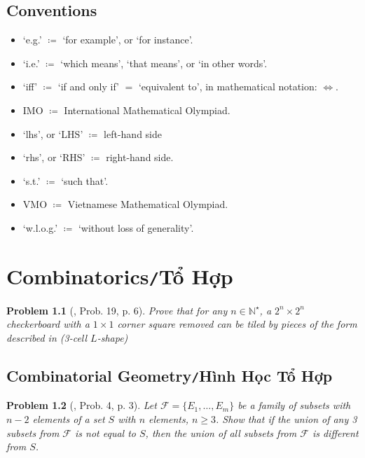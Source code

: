 \documentclass[oneside]{book}
\numberwithin{equation}{section}
\newtheorem{problem}{Problem}[section]
\begin{document}
\section*{Conventions}
\begin{itemize}
	\item `e.g.' $\coloneqq$ `for example', or `for instance'.
	\item `i.e.' $\coloneqq$ `which means', `that means', or `in other words'.
	\item `iff' $\coloneqq$ `if and only if' $=$ `equivalent to', in mathematical notation: $\Leftrightarrow$.
	\item IMO $\coloneqq$ International Mathematical Olympiad.
	\item `lhs', or `LHS' $\coloneqq$ left-hand side
	\item `rhs', or `RHS' $\coloneqq$ right-hand side.
	\item `s.t.' $\coloneqq$ `such that'.
	\item VMO $\coloneqq$ Vietnamese Mathematical Olympiad.
	\item `w.l.o.g.' $\coloneqq$ `without loss of generality'.
\end{itemize}


\chapter{Combinatorics\texttt{/}Tổ Hợp}

\begin{problem}[\cite{Gelca_Andreescu2017}, Prob. 19, p. 6]
	Prove that for any $n\in\mathbb{N}^\star$, a $2^n\times 2^n$ checkerboard with a $1\times 1$ corner square removed can be tiled by pieces of the form described in \cite[Fig. 2, p. 6]{Gelca_Andreescu2017} (3-cell $L$-shape)
\end{problem}

\section{Combinatorial Geometry\texttt{/}Hình Học Tổ Hợp}

\begin{problem}[\cite{Gelca_Andreescu2017}, Prob. 4, p. 3]
	Let $\mathcal{F} = \{E_1,\ldots,E_m\}$ be a family of subsets with $n - 2$ elements of a set $S$ with $n$ elements, $n\ge 3$. Show that if the union of any 3 subsets from $\mathcal{F}$ is not equal to $S$, then the union of all subsets from $\mathcal{F}$ is different from $S$.
\end{problem}
\end{document}
